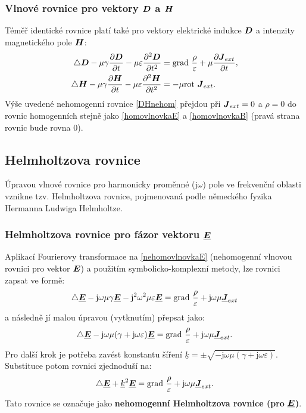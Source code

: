 \documentclass[12pt,a4paper,oneside]{article}
\numberwithin{equation}{section} %
\numberwithin{figure}{section} %
\numberwithin{table}{section} %
\newcommand{\mj}{\mathrm{j}} %
\renewcommand{\vec}[1]{\mbox{\boldmath$#1$}} %
\newcommand{\faz}[1]{{\underline{#1}}} %
\newcommand{\grad}{\mathrm{grad}\ }
\newcommand{\rot}{\mathrm{rot}\ }
\begin{document}
\subsubsection*{Vlnové rovnice pro vektory $\vec{D}$ a $\vec{H}$}
Téměř identické rovnice platí také pro vektory elektrické indukce $\vec{D}$ a intenzity magnetického pole $\vec{H}$:
\begin{subequations}
\label{DHnehom}
\begin{align}
\triangle \vec{D} - \mu \gamma \frac{\partial \vec{D}}{\partial t} - \mu \varepsilon \frac{\partial ^2 \vec{D}}{\partial t ^2} &= \grad \frac{\rho}{\varepsilon} + \mu \frac{\partial \vec{J} _{ext}}{\partial t} ,
\\
\triangle \vec{H} - \mu \gamma \frac{\partial \vec{H}}{\partial t} - \mu \varepsilon \frac{\partial ^2 \vec{H}}{\partial t ^2} &= - \mu \rot \vec{J} _{ext}.
\end{align}
\end{subequations}
Výše uvedené nehomogenní rovnice \ref{DHnehom} přejdou při $\vec{J} _{ext} = 0$ a $\rho = 0$ do rovnic homogenních stejně jako \ref{homovlnovkaE} a \ref{homovlnovkaB} (pravá strana rovnic bude rovna 0).



\subsection{Helmholtzova rovnice}
Úpravou vlnové rovnice pro harmonicky proměnné ($\mj \omega$) pole ve frekvenční oblasti vznikne tzv. Helmholtzova rovnice, pojmenovaná podle německého fyzika Hermanna Ludwiga Helmholtze.

\subsubsection*{Helmholtzova rovnice pro fázor vektoru $\faz{\vec{E}}$}
Aplikací Fourierovy transformace na \ref{nehomovlnovkaE} (nehomogenní vlnovou rovnici pro vektor $\vec{E}$) a použitím symbolicko-komplexní metody, lze rovnici zapsat ve formě:
\begin{equation}
\triangle \faz{\vec{E}} - \mj \omega \mu \gamma \faz{\vec{E}} - \mj ^2 \omega ^2 \mu \varepsilon \faz{\vec{E}} = \grad \frac{\rho}{\varepsilon} + \mj \omega \mu \faz{\vec{J}} _{ext}
\end{equation}
a následně jí malou úpravou (vytknutím) přepsat jako:
\begin{equation}
\triangle \faz{\vec{E}} - \mj \omega \mu (\gamma + \mj \omega \varepsilon) \faz{\vec{E}} = \grad \frac{\rho}{\varepsilon} + \mj \omega \mu \faz{\vec{J}} _{ext} .
\end{equation}
Pro další krok je potřeba zavést konstantu šíření $\faz{k} = \pm \sqrt{- \mj \omega \mu (\gamma + \mj \omega \varepsilon)}$. Substituce potom rovnici zjednoduší na:
\begin{equation}
\label{HelmholtzEnehomo}
\triangle \faz{\vec{E}} + \faz{k} ^2 \faz{\vec{E}} = \grad \frac{\rho}{\varepsilon} + \mj \omega \mu \faz{\vec{J}} _{ext} .
\end{equation}
Tato rovnice se označuje jako \textbf{nehomogenní Helmholtzova rovnice (pro} $\faz{\vec{E}}$\textbf{)}.
\end{document}
